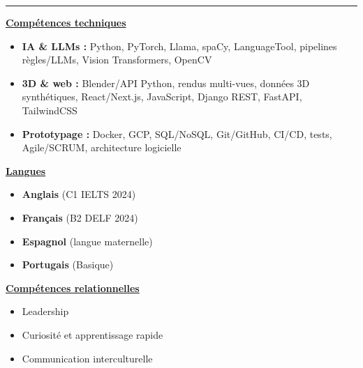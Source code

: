 \documentclass[letterpaper,10pt]{article}
\begin{document}
  

\vspace{9pt}
\noindent\rule{\textwidth}{0.4pt}
\vspace{2pt}

\noindent
\begin{minipage}[t]{0.39\textwidth}
  \raggedright
  \textbf{\underline{Compétences techniques}}\\[-2pt]
  {\scriptsize
    \begin{itemize}[leftmargin=*,itemsep=1pt,parsep=0pt,topsep=0pt,partopsep=0pt]
      \item \textbf{IA \& LLMs :} Python, PyTorch, Llama, spaCy, LanguageTool, pipelines règles/LLMs, Vision Transformers, OpenCV
      \item \textbf{3D \& web :} Blender/API Python, rendus multi-vues, données 3D synthétiques, React/Next.js, JavaScript, Django REST, FastAPI, TailwindCSS
      \item \textbf{Prototypage :} Docker, GCP, SQL/NoSQL, Git/GitHub, CI/CD, tests, Agile/SCRUM, architecture logicielle
    \end{itemize}
  }
\end{minipage}\hfill
\begin{minipage}[t]{0.28\textwidth}
  \raggedright
  \textbf{\underline{Langues}}\\[-2pt]
  {\scriptsize
    \begin{itemize}[leftmargin=*,itemsep=0pt,parsep=0pt,topsep=0pt,partopsep=0pt]
      \item \textbf{Anglais} (C1 \textendash{} IELTS 2024)
      \item \textbf{Français} (B2 \textendash{} DELF 2024)
      \item \textbf{Espagnol} (langue maternelle)
      \item \textbf{Portugais} (Basique)
    \end{itemize}
  }

  \vspace{0.12cm}
  \textbf{\underline{Compétences relationnelles}}\\[-2pt]
  {\scriptsize
    \begin{itemize}[leftmargin=*,itemsep=1pt,parsep=0pt,topsep=0pt,partopsep=0pt]
      \item Leadership
      \item Curiosité et apprentissage rapide
      \item Communication interculturelle
    \end{itemize}
  }
\end{minipage}\hfill
\end{document}
